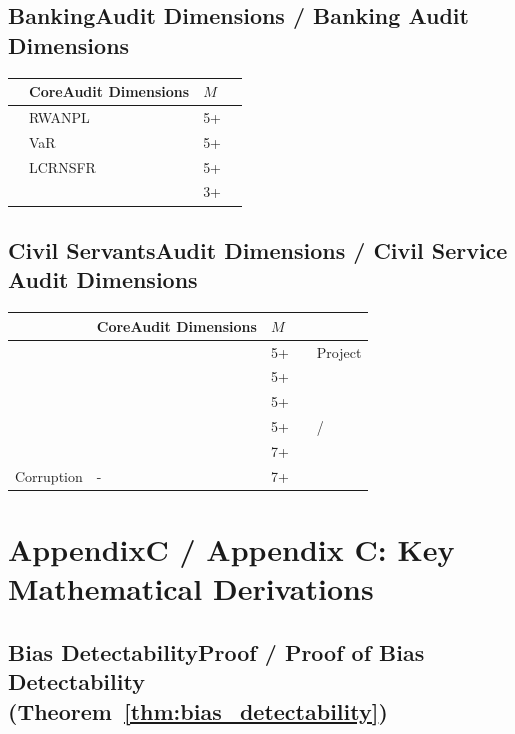 \documentclass[12pt,a4paper]{article}
\theoremstyle{remark}
\begin{document}
\subsection{BankingAudit Dimensions / Banking Audit Dimensions}

\begin{table}[H]
\centering
\begin{tabular}{@{}p{2.5cm}p{5.5cm}p{1.5cm}p{2.5cm}@{}}
\toprule
\textbf{} & \textbf{CoreAudit Dimensions} & \textbf{$M$} & \textbf{} \\
\midrule
 & RWANPL & 5+ &  \\
 & VaR & 5+ &  \\
 & LCRNSFR & 5+ &  \\
 &  & 3+ &  \\
\bottomrule
\end{tabular}
\end{table}

\subsection{Civil ServantsAudit Dimensions / Civil Service Audit Dimensions}

\begin{table}[H]
\centering
\begin{tabular}{@{}p{2.5cm}p{5cm}p{1.5cm}p{1.5cm}p{1.5cm}@{}}
\toprule
\textbf{} & \textbf{CoreAudit Dimensions} & \textbf{$M$} & \textbf{} & \textbf{} \\
\midrule
 &  & 5+ &  & Project \\
 &  & 5+ &  &  \\
 &  & 5+ &  &  \\
 &  & 5+ &  & / \\
 &  & 7+ &  &  \\
Corruption & - & 7+ &  &  \\
\bottomrule
\end{tabular}
\end{table}

\section{AppendixC / Appendix C: Key Mathematical Derivations}

\subsection{Bias DetectabilityProof / Proof of Bias Detectability (Theorem~\ref{thm:bias_detectability})}
\end{document}
